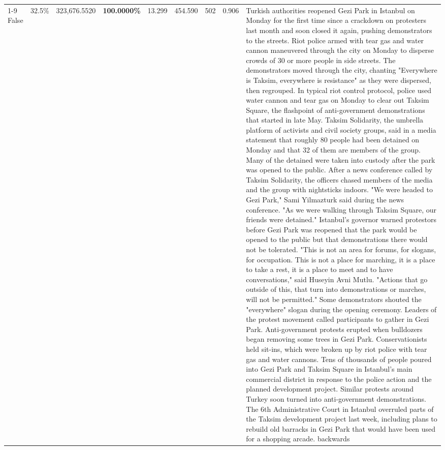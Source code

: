\begin{table}[H]
\begin{tabular}{lllrlllll}
\cline{1-9}
False & 32.5\% & 323,676.5520 & \bfseries \color{red} 100.0000\% & 13.299 & 454.590 & 502 & 0.906 & Turkish authorities reopened Gezi Park in Istanbul on Monday for the first time since a crackdown on protesters last month and soon closed it again, pushing demonstrators to the streets. Riot police armed with tear gas and water cannon maneuvered through the city on Monday to disperse crowds of 30 or more people in side streets. The demonstrators moved through the city, chanting "Everywhere is Taksim, everywhere is resistance" as they were dispersed, then regrouped. In typical riot control protocol, police used water cannon and tear gas on Monday to clear out Taksim Square, the flashpoint of anti-government demonstrations that started in late May. Taksim Solidarity, the umbrella platform of activists and civil society groups, said in a media statement that roughly 80 people had been detained on Monday and that 32 of them are members of the group. Many of the detained were taken into custody after the park was opened to the public. After a news conference called by Taksim Solidarity, the officers chased members of the media and the group with nightsticks indoors. "We were headed to Gezi Park," Sami Yilmazturk said during the news conference. "As we were walking through Taksim Square, our friends were detained." Istanbul's governor warned protestors before Gezi Park was reopened that the park would be opened to the public but that demonstrations there would not be tolerated. "This is not an area for forums, for slogans, for occupation. This is not a place for marching, it is a place to take a rest, it is a place to meet and to have conversations," said Huseyin Avni Mutlu. "Actions that go outside of this, that turn into demonstrations or marches, will not be permitted." Some demonstrators shouted the "everywhere" slogan during the opening ceremony. Leaders of the protest movement called participants to gather in Gezi Park. Anti-government protests erupted when bulldozers began removing some trees in Gezi Park. Conservationists held sit-ins, which were broken up by riot police with tear gas and water cannons. Tens of thousands of people poured into Gezi Park and Taksim Square in Istanbul's main commercial district in response to the police action and the planned development project. Similar protests around Turkey soon turned into anti-government demonstrations. The 6th Administrative Court in Istanbul overruled parts of the Taksim development project last week, including plans to rebuild old barracks in Gezi Park that would have been used for a shopping arcade. backwards \\

\end{tabular}
\end{table}

